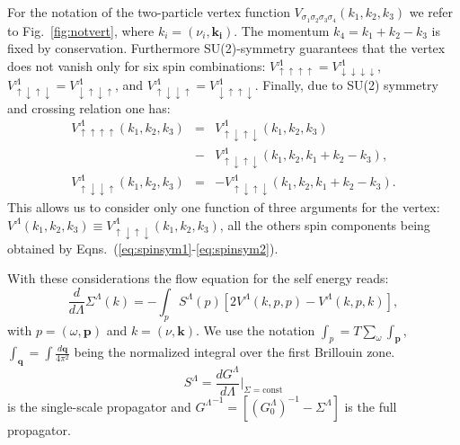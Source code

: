 For the notation of the two-particle vertex function $V_{\sigma_1\sigma_2\sigma_3\sigma_4}(k_1,k_2,k_3)$ we refer to Fig.~\ref{fig:notvert}, where $k_i=(\nu_i,\mathbf{k_i})$.
 The momentum $k_4=k_1+k_2-k_3$ is fixed by conservation.%
Furthermore  SU(2)-symmetry guarantees that the vertex does not vanish only for six spin combinations:
$
 V^\Lambda_{\uparrow\uparrow\uparrow\uparrow} = V^\Lambda_{\downarrow\downarrow\downarrow\downarrow}$, 
$  V^\Lambda_{\uparrow\downarrow\uparrow\downarrow} = V^\Lambda_{\downarrow\uparrow\downarrow\uparrow}  $, and
$  V^\Lambda_{\uparrow\downarrow\downarrow\uparrow } = V^\Lambda_{\downarrow\uparrow\uparrow\downarrow}$.   
Finally, due to SU(2) symmetry and crossing relation one has:\cite{Rohringer2012} 
\begin{eqnarray}
\nonumber
V^\Lambda_{\uparrow\uparrow\uparrow\uparrow}(k_1,k_2,k_3) &=& V^\Lambda_{\uparrow\downarrow\uparrow\downarrow}(k_1,k_2,k_3)\\&-& V^\Lambda_{\uparrow\downarrow\uparrow\downarrow}(k_1,k_2,k_1+k_2-k_3),
\label{eq:spinsym1}
 \\ 
V^\Lambda_{\uparrow\downarrow\downarrow\uparrow}(k_1,k_2,k_3)& =& -V^\Lambda_{\uparrow\downarrow\uparrow\downarrow}(k_1,k_2,k_1+k_2-k_3).
\label{eq:spinsym2}
\end{eqnarray}
This allows us to consider only one function of three arguments for the vertex:  $V^\Lambda(k_1,k_2,k_3)\equiv V^\Lambda_{\uparrow\downarrow\uparrow\downarrow}(k_1,k_2,k_3)$, all the others spin components being obtained by Eqns.~(\ref{eq:spinsym1}-\ref{eq:spinsym2}). 

With these considerations the flow equation for the self energy\cite{Metzner2012} reads: 
\begin{equation}
\frac{d}{d \Lambda} \Sigma^\Lambda(k)= -\int_p  S^\Lambda(p)\left[2V^\Lambda(k,p,p) -V^\Lambda(k,p,k)\right], 
\end{equation}
with $p=(\omega,\mathbf{p})$ and $k = (\nu,\mathbf{k})$. We use the notation  $\int_{p} =T\sum_\omega \int_{\mathbf{p}}$, $\int_{\mathbf{q}}=\int  \frac{d\mathbf{q}}{4\pi^2}$ being the normalized integral over the first Brillouin zone. 
\begin{equation}
 S^\Lambda=\frac{dG^\Lambda}{d\Lambda}\Bigg|_{\Sigma=\mathrm{const}} 
\end{equation}
  is the single-scale propagator and ${G^\Lambda}^{-1}=\left[(G_0^\Lambda)^{-1}-\Sigma^\Lambda\right]$ is the full propagator. 
  
